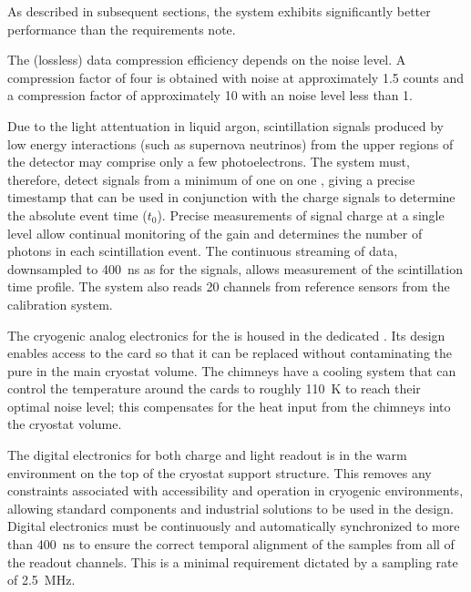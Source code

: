 As described in subsequent sections, %
the system exhibits significantly better performance than the requirements note.

The (lossless) data compression efficiency depends on the noise level. A compression factor of four is obtained with noise at approximately \SI{1.5}{} counts and  
 a compression factor of approximately \num{10} 
with an  noise level less than \SI{1}{}. 

Due to the light attentuation in liquid argon, scintillation signals produced by low energy interactions (such as supernova neutrinos) from the upper regions of the detector may comprise only a few photoelectrons. The   system must, therefore, detect signals from a minimum of one \phel on one , giving a precise timestamp that can be used in conjunction with the charge signals to determine the absolute event time ($t_0$). Precise measurements of  signal charge at a single \phel level allow continual monitoring of the  gain and determines the number of photons in each scintillation event. 
The continuous  streaming of data, downsampled to \SI{400}{ns} as for the  signals, allows measurement of the scintillation time profile. The  system also reads \num{20} channels from reference   sensors from the  calibration system.


The cryogenic analog electronics for the  is housed in the dedicated . Its design enables access to the  card so that it can be replaced without contaminating the pure in the main cryostat volume. The chimneys have a cooling system that can control the temperature around the  cards to roughly \SI{110}{\kelvin} to reach their optimal noise level; this compensates for the heat input from the chimneys into the cryostat volume. 

The digital electronics for both charge and light readout is in the warm environment on the top of the cryostat support structure. %
This removes any constraints associated with  accessibility and operation in cryogenic environments, allowing standard components and industrial solutions to be used in the design. Digital electronics must be continuously and automatically synchronized to more than \SI{400}{\nano\s} to ensure the correct temporal alignment of the  samples from all of the readout channels. This is a minimal requirement dictated by a sampling rate of \SI{2.5}{\MHz}.  

